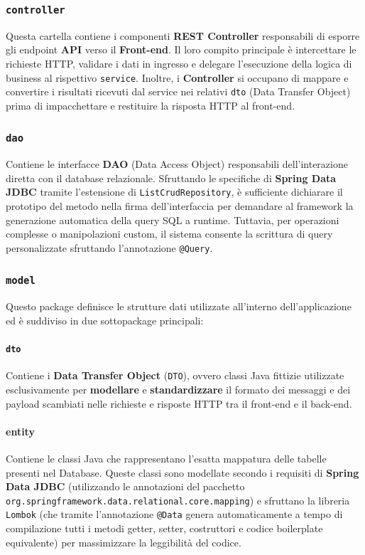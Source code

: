 \subsubsection{\texttt{controller}}
Questa cartella contiene i componenti \textbf{REST Controller} responsabili di esporre gli endpoint \textbf{API} verso il \textbf{Front-end}. Il loro compito principale è intercettare le richieste HTTP, validare i dati in ingresso e delegare l'esecuzione della logica di business al rispettivo \texttt{service}. Inoltre, i \textbf{Controller} si occupano di mappare e convertire i risultati ricevuti dal service nei relativi \texttt{dto} (Data Transfer Object) prima di impacchettare e restituire la risposta HTTP al front-end.

\subsubsection{\texttt{dao}}
Contiene le interfacce \textbf{DAO} (Data Access Object) responsabili dell'interazione diretta con il database relazionale. Sfruttando le specifiche di \textbf{Spring Data JDBC} tramite l'estensione di \texttt{ListCrudRepository}, è sufficiente dichiarare il prototipo del metodo nella firma dell'interfaccia per demandare al framework la generazione automatica della query SQL a runtime. Tuttavia, per operazioni complesse o manipolazioni custom, il sistema consente la scrittura di query personalizzate sfruttando l'annotazione \texttt{@Query}.

\subsubsection{\texttt{model}}
Questo package definisce le strutture dati utilizzate all'interno dell'applicazione ed è suddiviso in due sottopackage principali:

\paragraph{\texttt{dto}}
Contiene i \textbf{Data Transfer Object} (\texttt{DTO}), ovvero classi Java fittizie utilizzate esclusivamente per \textbf{modellare} e \textbf{standardizzare} il formato dei messaggi e dei payload scambiati nelle richieste e risposte HTTP tra il front-end e il back-end.

\paragraph{entity}
Contiene le classi Java che rappresentano l'esatta mappatura delle tabelle presenti nel Database. Queste classi sono modellate secondo i requisiti di \textbf{Spring Data JDBC} (utilizzando le annotazioni del pacchetto \texttt{org.springframework.data.relational.core.mapping}) e sfruttano la libreria \texttt{Lombok} (che tramite l'annotazione \texttt{@Data} genera automaticamente a tempo di compilazione tutti i metodi getter, setter, costruttori e codice boilerplate equivalente) per massimizzare la leggibilità del codice.

